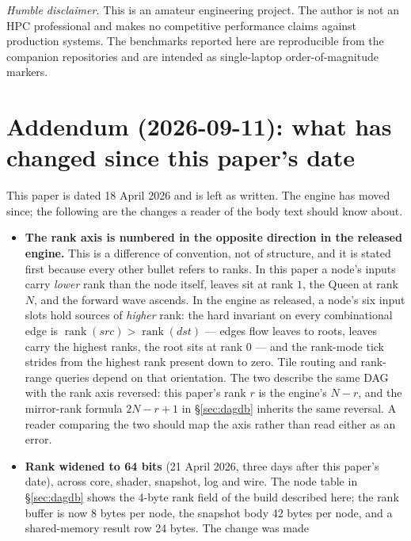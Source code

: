 \documentclass[11pt]{article}
\newcommand{\rank}{\operatorname{rank}}
\begin{document}
\noindent\textit{Humble disclaimer.} This is an amateur engineering
project. The author is not an HPC professional and makes no
competitive performance claims against production systems. The
benchmarks reported here are reproducible from the companion
repositories and are intended as single-laptop order-of-magnitude
markers.

\section*{Addendum (2026-09-11): what has changed since this paper's
date}

This paper is dated 18 April 2026 and is left as written. The engine
has moved since; the following are the changes a reader of the body
text should know about.

\begin{itemize}[label={--},leftmargin=1.6em]
  \item \textbf{The rank axis is numbered in the opposite direction in
        the released engine.} This is a difference of convention, not
        of structure, and it is stated first because every other
        bullet refers to ranks. In this paper a node's inputs carry
        \emph{lower} rank than the node itself, leaves sit at rank $1$,
        the Queen at rank $N$, and the forward wave ascends. In the
        engine as released, a node's six input slots hold sources of
        \emph{higher} rank: the hard invariant on every combinational
        edge is $\rank(src) > \rank(dst)$ --- edges flow leaves to
        roots, leaves carry the highest ranks, the root sits at rank
        $0$ --- and the rank-mode tick strides from the highest rank
        present down to zero. Tile routing and rank-range queries
        depend on that orientation. The two describe the same DAG with
        the rank axis reversed: this paper's rank $r$ is the engine's
        $N - r$, and the mirror-rank formula $2N - r + 1$ in
        \S\ref{sec:dagdb} inherits the same reversal. A reader
        comparing the two should map the axis rather than read either
        as an error.
  \item \textbf{Rank widened to 64 bits} (21 April 2026, three days
        after this paper's date), across core, shader, snapshot, log
        and wire. The node table in \S\ref{sec:dagdb} shows the
        4-byte rank field of the build described here; the rank buffer
        is now 8 bytes per node, the snapshot body 42 bytes per node,
        and a shared-memory result row 24 bytes. The change was made

\end{itemize}
\end{document}
